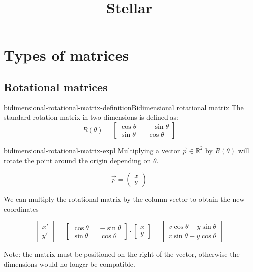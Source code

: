 \documentclass[preview]{standalone}
\begin{document}
\title{Stellar}
\genpage

\section{Types of matrices}

\subsection{Rotational matrices}

\begin{snippetdefinition}{bidimensional-rotational-matrix-definition}{Bidimensional rotational matrix}
    The standard rotation matrix in two dimensions is defined as:
    \[
        R(\theta)=
        \begin{bmatrix} 
            \cos\theta && -\sin\theta \\
            \sin\theta && \cos\theta
        \end{bmatrix}
    \]
\end{snippetdefinition}

\begin{snippet}{bidimensional-rotational-matrix-expl}
    Multiplying a vector \(\vec{p}\in {\mathbb{R}}^2\) by \(R(\theta)\) will rotate the point around the origin depending on \(\theta\).

    \[
        \vec{p}=
        \begin{pmatrix} 
            x \\
            y
        \end{pmatrix}
    \]
    
    We can multiply the rotational matrix by the column vector to obtain the new coordinates
    
    \[
        \begin{bmatrix} 
            x' \\
            y'
        \end{bmatrix}
        =
        \begin{bmatrix} 
            \cos\theta && -\sin\theta \\
            \sin\theta && \cos\theta
        \end{bmatrix}
        \cdot
        \begin{bmatrix} 
            x \\
            y
        \end{bmatrix}
        =
        \begin{bmatrix} 
            x\cos\theta - y\sin\theta \\
            x\sin\theta + y\cos\theta
        \end{bmatrix}
    \]
    
    Note: the matrix must be positioned on the right of the vector, otherwise the dimensions would no longer be compatible.
\end{snippet}
\end{document}
